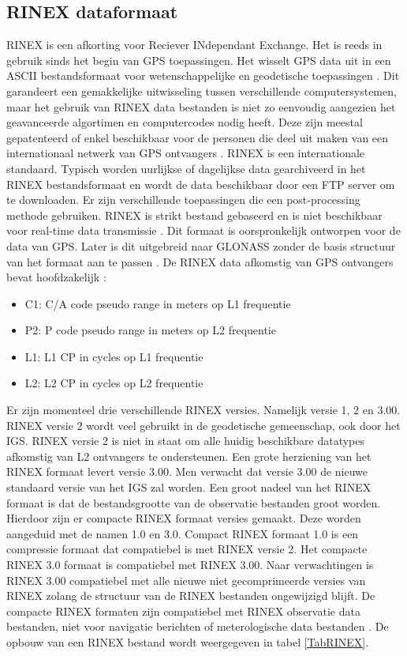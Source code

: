 \subsection{RINEX dataformaat}
\label{LRin}
RINEX is een afkorting voor Reciever INdependant Exchange. Het is reeds in gebruik sinds het begin van GPS toepassingen. Het wisselt GPS data uit in een ASCII bestandsformaat voor wetenschappelijke en geodetische toepassingen \cite{LBibRTCM}. Dit garandeert een gemakkelijke uitwisseling tussen verschillende computersystemen, maar het gebruik van RINEX data bestanden is niet zo eenvoudig aangezien het geavanceerde algortimen en computercodes nodig heeft. Deze zijn meestal gepatenteerd of enkel beschikbaar voor de personen die deel uit maken van een internationaal netwerk van GPS ontvangers \cite{LBibGPS5}. RINEX is een internationale standaard. Typisch worden uurlijkse of dagelijkse data gearchiveerd in het RINEX bestandsformaat en wordt de data beschikbaar door een FTP server om te downloaden. Er zijn verschillende toepassingen die een post-processing methode gebruiken. RINEX is strikt bestand gebaseerd en is niet beschikbaar voor real-time data transmissie \cite{LBibRTCM}. Dit formaat is oorspronkelijk ontworpen voor de data van GPS. Later is dit uitgebreid naar GLONASS zonder de basis structuur van het formaat aan te passen \cite{LBibRINEX}. De RINEX data afkomstig van GPS ontvangers bevat hoofdzakelijk \cite{LBibGPS5}:
\begin{itemize}
	\item C1: C/A code pseudo range in meters op L1 frequentie
	\item P2: P code pseudo range in meters op L2 frequentie
	\item L1: L1 CP in cycles op L1 frequentie
	\item L2: L2 CP in cycles op L2 frequentie
\end{itemize}
 Er zijn momenteel drie verschillende RINEX versies. Namelijk versie 1, 2 en 3.00. RINEX versie  2 wordt veel gebruikt in de geodetische gemeenschap, ook door het IGS. RINEX versie 2 is niet in staat om alle huidig beschikbare datatypes afkomstig van L2 ontvangers te ondersteunen. Een grote herziening van het RINEX formaat levert versie 3.00. Men verwacht dat versie 3.00 de nieuwe standaard versie van het IGS zal worden. Een groot nadeel van het RINEX formaat is dat de bestandsgrootte van de observatie bestanden groot worden. Hierdoor zijn er compacte RINEX formaat versies gemaakt. Deze worden aangeduid met de namen 1.0 en 3.0. Compact RINEX formaat 1.0 is een compressie formaat dat compatiebel is met RINEX versie 2. Het compacte RINEX 3.0 formaat is compatiebel met RINEX 3.00. Naar verwachtingen is RINEX 3.00 compatiebel met alle nieuwe niet gecomprimeerde versies van RINEX zolang de structuur van de RINEX bestanden ongewijzigd blijft.  De compacte RINEX formaten zijn compatiebel met RINEX observatie data bestanden, niet voor navigatie berichten of meterologische data bestanden \cite{LBibRINEX}. De opbouw van een RINEX bestand wordt weergegeven in tabel \ref{TabRINEX}.
 

